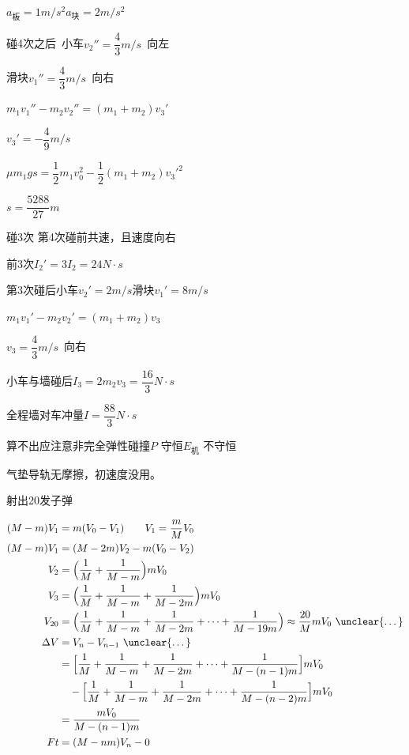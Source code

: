 \begin{problem}[21，15分]
\begin{solution}
$a_{\text{板}}=1\unit{m/s^2}$\quad $a_{\text{块}}=2\unit{m/s^2}$

碰4次之后\ 小车$v_2''=\dfrac{4}{3}\unit{m/s}$\ 向左

滑块$v_1''=\dfrac{4}{3}\unit{m/s}$\ 向右

$m_1v_1''-m_2v_2''=(m_1+m_2)v_3'$

$v_3'=-\dfrac{4}{9}\unit{m/s}$

$\mu m_1gs=\dfrac{1}{2}m_1v_0^2-\dfrac{1}{2}(m_1+m_2)v_3'^2$

$s=\dfrac{5288}{27}\unit{m}$


碰3次 第4次碰前共速，且速度向右

前3次\quad $I_2'=3I_2=24\unit{N\cdot s}$

第3次碰后\quad 小车$v_2'=2\unit{m/s}$\quad 滑块$v_1'=8\unit{m/s}$

$m_1v_1'-m_2v_2'=(m_1+m_2)v_3$

$v_3=\dfrac{4}{3}\unit{m/s}$\ 向右

小车与墙碰后\quad $I_3=2m_2v_3=\dfrac{16}{3}\unit{N\cdot s}$

全程墙对车冲量\quad $I=\dfrac{88}{3}\unit{N\cdot s}$
\end{solution}
\end{problem}
算不出应注意非完全弹性碰撞\quad $P$ 守恒\quad $E_{\text{机}}$ 不守恒
\begin{problem}
气垫导轨无摩擦，初速度没用。%

射出20发子弹
\begin{solution}
\begin{align*}
(M-m)V_1&=m(V_0-V_1)\qquad V_1=\frac{m}{M}V_0\\
(M-m)V_1&=(M-2m)V_2-m(V_0-V_2)\\
V_2&=\Bigl(\frac{1}{M}+\frac{1}{M-m}\Bigr)mV_0\\
V_3&=\Bigl(\frac{1}{M}+\frac{1}{M-m}+\frac{1}{M-2m}\Bigr)mV_0\\
V_{20}&=\Bigl(\frac{1}{M}+\frac{1}{M-m}+\frac{1}{M-2m}+\cdots+\frac{1}{M-19m}\Bigr)\approx\frac{20}{M}mV_0\ \text{\unclear{…}}\\
\Delta V&=V_n-V_{n-1}\ \text{\unclear{…}}\\
&=\Bigl[\frac{1}{M}+\frac{1}{M-m}+\frac{1}{M-2m}+\cdots+\frac{1}{M-(n-1)m}\Bigr]mV_0\\
&\quad-\Bigl[\frac{1}{M}+\frac{1}{M-m}+\frac{1}{M-2m}+\cdots+\frac{1}{M-(n-2)m}\Bigr]mV_0\\
&=\frac{mV_0}{M-(n-1)m}\\
Ft&=(M-nm)V_n-0
\end{align*}
\end{solution}
\end{problem}
